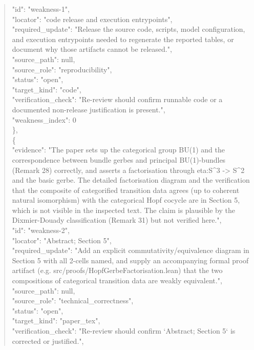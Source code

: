 \documentclass[11pt]{article}
\begin{document}
\begin{quote}
      "id": "weakness-1",\\
      "locator": "code release and execution entrypoints",\\
      "required\_update": "Release the source code, scripts, model configuration, and execution entrypoints needed to regenerate the reported tables, or document why those artifacts cannot be released.",\\
      "source\_path": null,\\
      "source\_role": "reproducibility",\\
      "status": "open",\\
      "target\_kind": "code",\\
      "verification\_check": "Re-review should confirm runnable code or a documented non-release justification is present.",\\
      "weakness\_index": 0\\
    \},\\
    \{\\
      "evidence": "The paper sets up the categorical group BU(1) and the correspondence between bundle gerbes and principal BU(1)-bundles (Remark 28) correctly, and asserts a factorisation through eta:S\^{}3 -> S\^{}2 and the basic gerbe. The detailed factorisation diagram and the verification that the composite of categorified transition data agrees (up to coherent natural isomorphism) with the categorical Hopf cocycle are in Section 5, which is not visible in the inspected text. The claim is plausible by the Dixmier-Douady classification (Remark 31) but not verified here.",\\
      "id": "weakness-2",\\
      "locator": "Abstract; Section 5",\\
      "required\_update": "Add an explicit commutativity/equivalence diagram in Section 5 with all 2-cells named, and supply an accompanying formal proof artifact (e.g. src/proofs/HopfGerbeFactorisation.lean) that the two compositions of categorical transition data are weakly equivalent.",\\
      "source\_path": null,\\
      "source\_role": "technical\_correctness",\\
      "status": "open",\\
      "target\_kind": "paper\_tex",\\
      "verification\_check": "Re-review should confirm `Abstract; Section 5` is corrected or justified.",\\

\end{quote}
\end{document}
